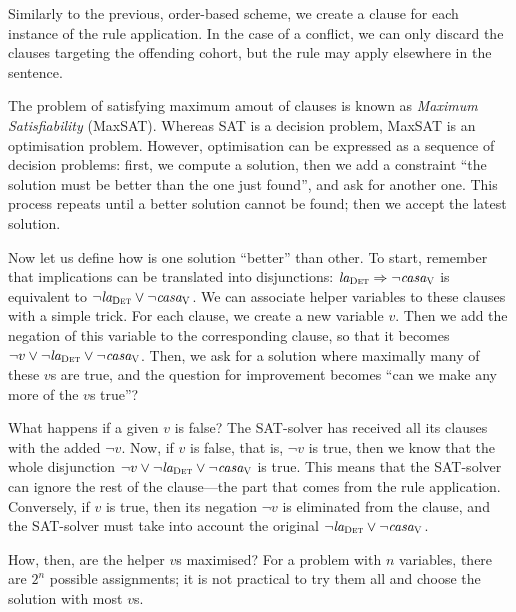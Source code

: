 Similarly to the previous, order-based scheme, we create a clause for each 
instance of the rule application. In the case of a conflict, we can 
only discard the clauses targeting the offending cohort, but the rule may apply 
elsewhere in the sentence.


The problem of satisfying maximum amout of clauses is known as \emph{Maximum Satisfiability} (MaxSAT).
Whereas SAT is a decision problem, MaxSAT is an optimisation problem.
However, optimisation can be expressed as a sequence of decision problems:
first, we compute a solution, then we add a constraint ``the solution must be better than the one just found'', and ask for another one. 
This process repeats until a better solution cannot be found; then we accept the 
latest solution.

Now let us define how is one solution ``better'' than other. 
To start, remember that implications can be translated into disjunctions: 
$\text{\em la}_{\text{\sc Det}} \Rightarrow \neg\text{\em casa}_{\text{\sc V}}$ is equivalent to $\neg\text{\em la}_{\text{\sc Det}} \vee \neg\text{\em casa}_{\text{\sc V}}$. 
We can associate helper variables to these clauses with a simple trick.
For each clause, we create a new variable $v$. Then we add 
the negation of this variable to the corresponding clause, 
so that it becomes $\neg{}v \vee \neg\text{\em la}_{\text{\sc Det}} \vee \neg\text{\em casa}_{\text{\sc V}}$.
Then, we ask for a solution where maximally many of these $v$s are true,
and the question for improvement becomes ``can we make any more of the $v$s true''?

What happens if a given $v$ is false? The SAT-solver has received all its clauses 
with the added $\neg{}v$. 
Now, if $v$ is false, that is, $\neg{}v$ is true, then we know that 
the whole disjunction $\neg{}v \vee \neg\text{\em la}_{\text{\sc Det}} \vee \neg\text{\em casa}_{\text{\sc V}}$ is true.
This means that the SAT-solver can ignore the rest of the clause---the part that comes from the rule application.
Conversely, if $v$ is true, then its negation $\neg{}v$ is eliminated from the clause, 
and the SAT-solver must take into account the original $\neg\text{\em la}_{\text{\sc Det}} \vee \neg\text{\em casa}_{\text{\sc V}}$.


How, then, are the helper $v$s maximised? 
For a problem with $n$ variables, there are $2^n$ possible assignments; 
it is not practical to try them all and choose the solution with most $v$s.






